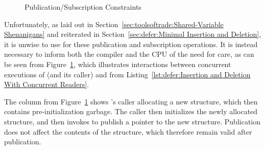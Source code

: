 \begin{figure}
\centering
{}
\caption{Publication/Subscription Constraints}
\label{fig:defer:Publication/Subscription Constraints}
\end{figure}

Unfortunately, as laid out in
Section~\ref{sec:toolsoftrade:Shared-Variable Shenanigans}
and reiterated in
Section~\ref{sec:defer:Minimal Insertion and Deletion},
it is unwise to use  for these publication and subscription
operations.
It is instead necessary to inform both the compiler and the CPU
of the need for care, as can be seen from
Figure~\ref{fig:defer:Publication/Subscription Constraints},
which illustrates interactions between concurrent executions of
 (and its caller) and  from
Listing~\ref{lst:defer:Insertion and Deletion With Concurrent Readers}.

The  column from
Figure~\ref{fig:defer:Publication/Subscription Constraints}
shows 's caller allocating a new  structure,
which then contains pre-initialization garbage.
The caller then initializes the newly allocated structure, and then
invokes  to publish a pointer to the new 
structure.
Publication does not affect the contents of the structure, which
therefore remain valid after publication.

